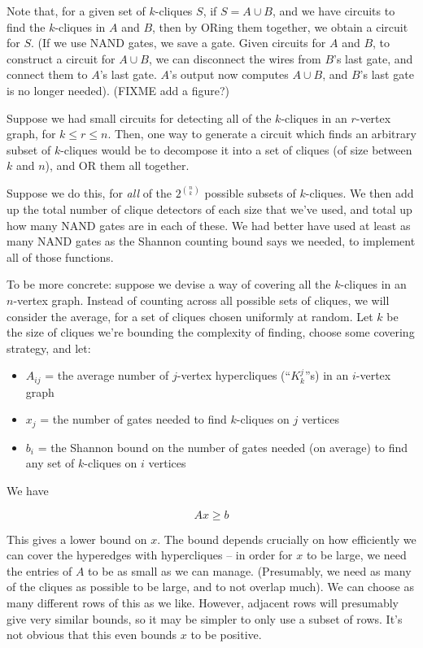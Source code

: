 \documentclass[12pt]{article}
\theoremstyle{definition}
\begin{document}
Note that, for a given set of $k$-cliques $S$, if $S = A \cup B$, and we
have circuits to find the $k$-cliques in $A$ and $B$, then by ORing them
together, we obtain a circuit for $S$. (If we use NAND gates, we
save a gate. Given circuits for $A$ and $B$, to construct a circuit
for $A \cup B$, we can disconnect the wires from $B$'s last gate, and
connect them to $A$'s last gate. $A$'s output now computes $A \cup B$,
and $B$'s last gate is no longer needed). (FIXME add a figure?)

Suppose we had small circuits for detecting all of the $k$-cliques
in an $r$-vertex graph, for $k \le r \le n$.
Then, one way to generate a circuit which finds an arbitrary subset
of $k$-cliques would be to decompose it into a set of
cliques (of size between $k$ and $n$), and OR them all together.

Suppose we do this, for {\em all} of the $2^{n \choose k}$ possible subsets of
$k$-cliques. We then add up the total number of clique detectors of each
size that we've used, and total up how many NAND gates are in each of these.
We had better have used at least as many NAND gates as the Shannon counting
bound says we needed, to implement all of those functions.

To be more concrete: suppose we
devise a way of covering all the $k$-cliques in an $n$-vertex
graph. Instead of counting across all possible sets of cliques, we will
consider the average, for a set of cliques chosen uniformly at random.
Let $k$ be the size of cliques we're bounding the complexity of finding,
choose some covering strategy, and let:

\begin{itemize}

\item $A_{ij}$ = the average number of $j$-vertex hypercliques (``$K^j_k$''s)
in an $i$-vertex graph

\item $x_{j}$ = the number of gates needed to find $k$-cliques on $j$ vertices

\item $b_{i}$ = the Shannon bound on the number of
gates needed (on average) to find any set of $k$-cliques on $i$ vertices

\end{itemize}

We have

\[
Ax \ge b
\]

This gives a lower bound on $x$. The bound depends
crucially on how efficiently
we can cover the hyperedges with hypercliques -- in order for $x$ to
be large, we need the entries of $A$ to be as small as we can manage.
(Presumably, we need as many of
the cliques as possible to be large, and to not overlap much).
We can choose as many different rows of this as we like.
However,
adjacent rows will presumably give very similar bounds, so it may be
simpler to only use a subset of rows.
It's not obvious that this even bounds $x$ to be positive.
\end{document}
